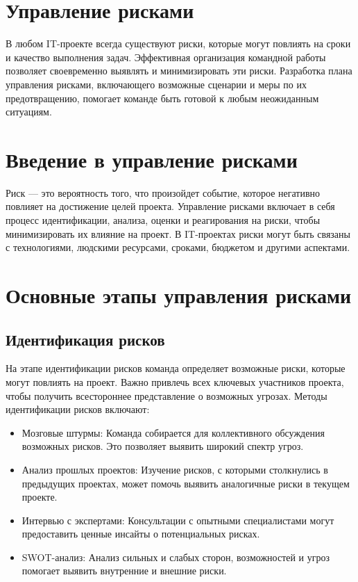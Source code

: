     \section{Управление рисками}
    В любом IT-проекте всегда существуют риски, которые могут повлиять на сроки и качество выполнения задач. Эффективная организация командной работы позволяет своевременно выявлять и минимизировать эти риски. Разработка плана управления рисками, включающего возможные сценарии и меры по их предотвращению, помогает команде быть готовой к любым неожиданным ситуациям.

    \section{Введение в управление рисками}
    Риск — это вероятность того, что произойдет событие, которое негативно повлияет на достижение целей проекта. Управление рисками включает в себя процесс идентификации, анализа, оценки и реагирования на риски, чтобы минимизировать их влияние на проект. В IT-проектах риски могут быть связаны с технологиями, людскими ресурсами, сроками, бюджетом и другими аспектами.

    \section{Основные этапы управления рисками}

    \subsection{Идентификация рисков}
    На этапе идентификации рисков команда определяет возможные риски, которые могут повлиять на проект. Важно привлечь всех ключевых участников проекта, чтобы получить всестороннее представление о возможных угрозах. Методы идентификации рисков включают:

    \begin{itemize}
        \item Мозговые штурмы: Команда собирается для коллективного обсуждения возможных рисков. Это позволяет выявить широкий спектр угроз.
        \item Анализ прошлых проектов: Изучение рисков, с которыми столкнулись в предыдущих проектах, может помочь выявить аналогичные риски в текущем проекте.
        \item Интервью с экспертами: Консультации с опытными специалистами могут предоставить ценные инсайты о потенциальных рисках.
        \item SWOT-анализ: Анализ сильных и слабых сторон, возможностей и угроз помогает выявить внутренние и внешние риски.
    \end{itemize}
    
